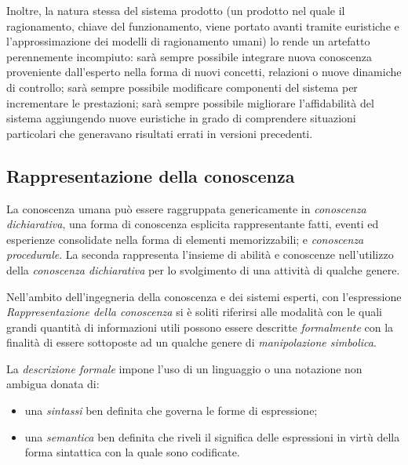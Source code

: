 Inoltre, la natura stessa del sistema prodotto (un prodotto nel quale il ragionamento, chiave del funzionamento, viene portato avanti tramite euristiche e l'approssimazione dei modelli di ragionamento umani) lo rende un artefatto perennemente incompiuto: sarà sempre possibile integrare nuova conoscenza proveniente dall'esperto nella forma di nuovi concetti, relazioni o nuove dinamiche di controllo; sarà sempre possibile modificare componenti del sistema per incrementare le prestazioni; sarà sempre possibile migliorare l'affidabilità del sistema aggiungendo nuove euristiche in grado di comprendere situazioni particolari che generavano risultati errati in versioni precedenti.

\subsection{Rappresentazione della conoscenza}

La conoscenza umana può essere raggruppata genericamente in \emph{conoscenza dichiarativa}, una forma di conoscenza esplicita rappresentante fatti, eventi ed esperienze consolidate nella forma di elementi memorizzabili; e \emph{conoscenza procedurale}. La seconda rappresenta l'insieme di abilità e conoscenze nell'utilizzo della \emph{conoscenza dichiarativa} per lo svolgimento di una attività di qualche genere.



Nell'ambito dell'ingegneria della conoscenza e dei sistemi esperti, con l'espressione \emph{Rappresentazione della conoscenza} si è soliti riferirsi alle modalità con le quali grandi quantità di informazioni utili possono essere descritte \emph{formalmente} con la finalità di essere sottoposte ad un qualche genere di \emph{manipolazione simbolica}. \cite{jackson1999}

La \emph{descrizione formale} impone l'uso di un linguaggio o una notazione non ambigua donata di:
\begin{itemize}
	\item una \emph{sintassi} ben definita che governa le forme di espressione;
	\item una \emph{semantica} ben definita che riveli il significa delle espressioni in virtù della forma sintattica con la quale sono codificate.
\end{itemize}

